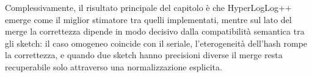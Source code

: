 Complessivamente, il risultato principale del capitolo è che HyperLogLog++
emerge come il miglior stimatore tra quelli implementati, mentre sul lato del
merge la correttezza dipende in modo decisivo dalla compatibilità semantica tra
gli sketch: il caso omogeneo coincide con il seriale, l'eterogeneità dell'hash
rompe la correttezza, e quando due sketch hanno precisioni diverse il merge resta recuperabile solo
attraverso una normalizzazione esplicita.
